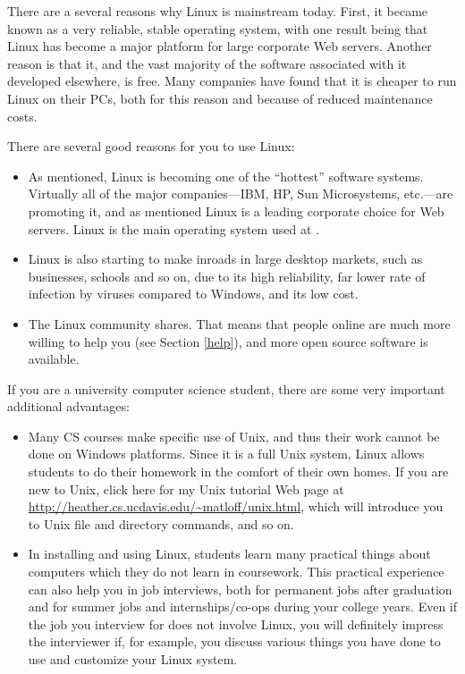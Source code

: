 \documentclass[11pt]{article}
\begin{document}
There are a several reasons why Linux is mainstream today.  First, it
became known as a very reliable, stable operating system, with one
result being that Linux has become a major platform for large corporate
Web servers.  Another reason is that it, and the vast majority of the
software associated with it developed elsewhere, is free.  Many
companies have found that it is cheaper to run Linux on their PCs, both
for this reason and because of reduced maintenance costs.

There are several good reasons for you to use Linux:

\begin{itemize}

\item As mentioned, Linux is becoming one of the ``hottest'' software
systems. Virtually all of the major companies---IBM, HP, Sun
Microsystems, etc.---are promoting it, and as mentioned Linux is a
leading corporate choice for Web servers.  Linux is the main operating
system used at . 

\item Linux is also starting to make inroads in large desktop markets,
such as businesses, schools and so on, due to its high reliability, far
lower rate of infection by viruses compared to Windows, and its low
cost.

\item The Linux community shares.  That means that people online are
much more willing to help you (see Section \ref{help}), and more open
source software is available.

\end{itemize}

If you are a university computer science student, there are some very
important additional advantages: 

\begin{itemize}

\item Many CS courses make specific use of Unix, and thus their work
cannot be done on Windows platforms. Since it is a full Unix system,
Linux allows students to do their homework in the comfort of their own
homes. If you are new to Unix, click here for my Unix tutorial Web page
at \url{http://heather.cs.ucdavis.edu/~matloff/unix.html}, which will
introduce you to Unix file and directory commands, and so on.

\item In installing and using Linux, students learn many practical
things about computers which they do not learn in coursework. This
practical experience can also help you in job interviews, both for
permanent jobs after graduation and for summer jobs and
internships/co-ops during your college years. Even if the job you
interview for does not involve Linux, you will definitely impress the
interviewer if, for example, you discuss various things you have done to
use and customize your Linux system.

\end{itemize}
\end{document}
